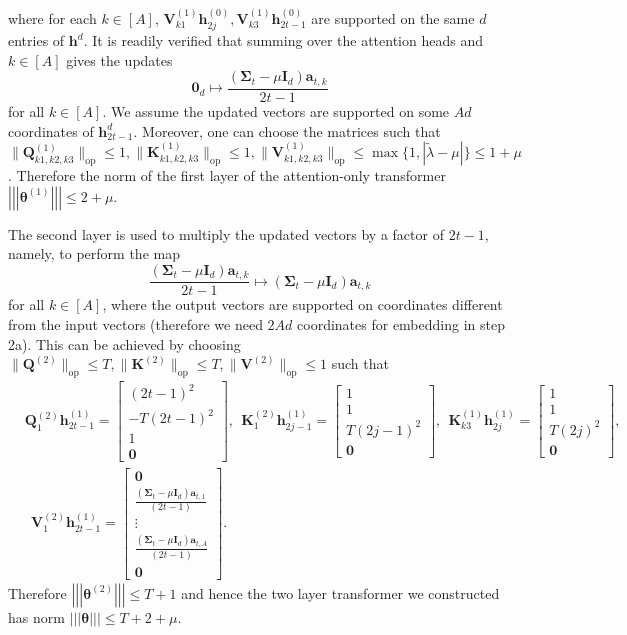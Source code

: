 \documentclass[10pt]{article}
\newcommand{\id}{\bI}
\newcommand{\lops}[1]{\|{#1}\|_{\mathrm{op}}}
\newcommand{\<}{\left\langle}
\renewcommand{\>}{\right\rangle}
\renewcommand{\bQ}{\mathbf{Q}}
\newcommand{\bzero}{{\mathbf 0}}
\newcommand{\nrmp}[1]{{\left|\!\left|\!\left|{#1}\right|\!\right|\!\right|}}
\newcommand{\partd}{{d}}
\newcommand{\Tpscov}{{{\mathbf\Sigma}}}
\newcommand{\prodeig}{{\mu}}
\def\bI{{\mathbf I}}
\def\bK{{\mathbf K}}
\def\bQ{{\mathbf Q}}
\def\bV{{\mathbf V}}
\def\btheta{{\boldsymbol \theta}}
\def\ba{{\mathbf a}}
\def\bh{{\mathbf h}}
\begin{document}
where for each $k\in[A]$, $\bV^{(1)}_{k1}\bh^{(0)}_{2j},\bV^{(1)}_{k3}\bh^{(0)}_{2t-1}$ are supported on the same $d$ entries of $\bh^\partd$. 
It is readily verified that  summing over the attention heads and $k\in[A]$ gives the updates
$$ \bzero_d\mapsto\frac{(\Tpscov_t-\prodeig\id_d)\ba_{t,k}}{2t-1}$$ for all $k\in[A]$. We assume the updated vectors are supported on some $Ad$ coordinates of $\bh_{2t-1}^d$. Moreover, one can choose the matrices such that $\lops{\bQ^{(1)}_{k1,k2,k3}}\leq1,\lops{\bK^{(1)}_{k1,k2,k3}}\leq1,\lops{\bV^{(1)}_{k1,k2,k3}}\leq \max\{1,|\tilde\lambda-\prodeig|\}\leq1+\prodeig$. Therefore the norm of the first layer of the attention-only transformer $\nrmp{\btheta^{(1)}}\leq 2+\prodeig$. 

The second layer is used to multiply the updated vectors by a factor of $2t-1$, namely, to perform the map
$$ \frac{(\Tpscov_t-\prodeig\id_d)\ba_{t,k}}{2t-1}\mapsto{(\Tpscov_t-\prodeig\id_d)\ba_{t,k}}$$ for all $k\in[A]$, where the output vectors are supported on coordinates different from the input vectors (therefore we need $2Ad$ coordinates for embedding in step 2a). This can be achieved by choosing $\lops{\bQ^{(2)}}\leq T, \lops{\bK^{(2)}}\leq T, \lops{\bV^{(2)}}\leq1$
such that \begin{align*}
    &
    \bQ^{(2)}_{1}\bh^{(1)}_{2t-1}=\begin{bmatrix}
         (2t-1)^2\\-T(2t-1)^2\\  1\\ \bzero
    \end{bmatrix},~~ \bK^{(2)}_{1}\bh^{(1)}_{2j-1}=\begin{bmatrix}
        1\\1\\ T(2j-1)^2\\\bzero
    \end{bmatrix},~~ 
    \bK^{(1)}_{k3}\bh^{(1)}_{2j}=\begin{bmatrix}
      1\\  1\\  T(2j)^2\\\bzero
    \end{bmatrix},\\&~~ \bV^{(2)}_{1}\bh^{(1)}_{2t-1}=\begin{bmatrix}
        \bzero\\ \frac{(\Tpscov_t-\prodeig\id_d)\ba_{t,1}}{(2t-1)}
\\\vdots\\
        \frac{(\Tpscov_t-\prodeig\id_d)\ba_{t,A}}{(2t-1)} \\ \bzero
    \end{bmatrix}.
\end{align*} Therefore $\nrmp{\btheta^{(2)}}\leq T+1$ and hence the two layer transformer we constructed has norm $\nrmp{\btheta}\leq T+2+\prodeig$.
\end{document}
